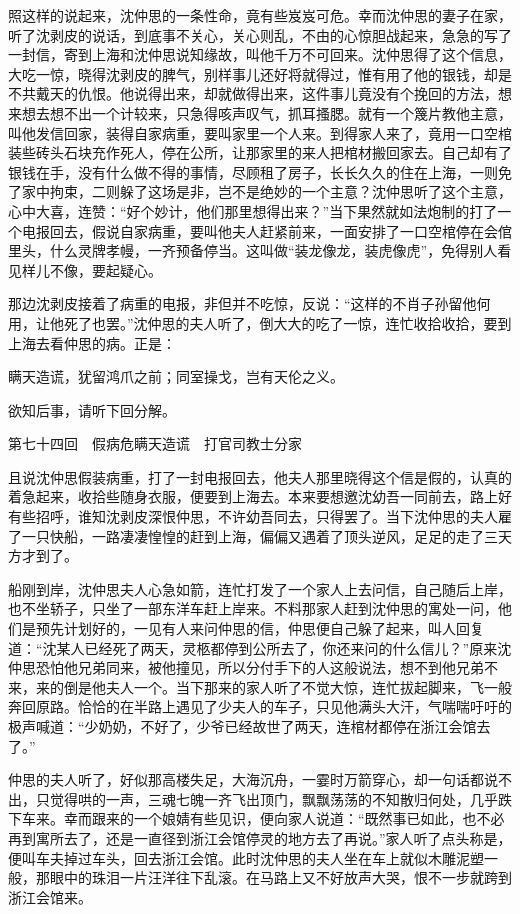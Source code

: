 \documentclass[12pt,UTF8]{ctexbook}
\begin{document}
{{{照这样的说起来，沈仲思的一条性命，竟有些岌岌可危。幸而沈仲思的妻子在家，听了沈剥皮的说话，到底事不关心，关心则乱，不由的心惊胆战起来，急急的写了一封信，寄到上海和沈仲思说知缘故，叫他千万不可回来。沈仲思得了这个信息，大吃一惊，晓得沈剥皮的脾气，别样事儿还好将就得过，惟有用了他的银钱，却是不共戴天的仇恨。他说得出来，却就做得出来，这件事儿竟没有个挽回的方法，想来想去想不出一个计较来，只急得咳声叹气，抓耳搔腮。就有一个篾片教他主意，叫他发信回家，装得自家病重，要叫家里一个人来。到得家人来了，竟用一口空棺装些砖头石块充作死人，停在公所，让那家里的来人把棺材搬回家去。自己却有了银钱在手，没有什么做不得的事情，尽顾租了房子，长长久久的住在上海，一则免了家中拘束，二则躲了这场是非，岂不是绝妙的一个主意？沈仲思听了这个主意，心中大喜，连赞：“好个妙计，他们那里想得出来？”当下果然就如法炮制的打了一个电报回去，假说自家病重，要叫他夫人赶紧前来，一面安排了一口空棺停在会倌里头，什么灵牌孝幔，一齐预备停当。这叫做“装龙像龙，装虎像虎”，免得别人看见样儿不像，要起疑心。

那边沈剥皮接着了病重的电报，非但并不吃惊，反说：“这样的不肖子孙留他何用，让他死了也罢。”沈仲思的夫人听了，倒大大的吃了一惊，连忙收拾收拾，要到上海去看仲思的病。正是：

瞒天造谎，犹留鸿爪之前；同室操戈，岂有天伦之义。

欲知后事，请听下回分解。





第七十四回　假病危瞒天造谎　打官司教士分家





且说沈仲思假装病重，打了一封电报回去，他夫人那里晓得这个信是假的，认真的着急起来，收拾些随身衣服，便要到上海去。本来要想邀沈幼吾一同前去，路上好有些招呼，谁知沈剥皮深恨仲思，不许幼吾同去，只得罢了。当下沈仲思的夫人雇了一只快船，一路凄凄惶惶的赶到上海，偏偏又遇着了顶头逆风，足足的走了三天方才到了。

船刚到岸，沈仲思夫人心急如箭，连忙打发了一个家人上去问信，自己随后上岸，也不坐轿子，只坐了一部东洋车赶上岸来。不料那家人赶到沈仲思的寓处一问，他们是预先计划好的，一见有人来问仲思的信，仲思便自己躲了起来，叫人回复道：“沈某人已经死了两天，灵柩都停到公所去了，你还来问的什么信儿？”原来沈仲思恐怕他兄弟同来，被他撞见，所以分付手下的人这般说法，想不到他兄弟不来，来的倒是他夫人一个。当下那来的家人听了不觉大惊，连忙拔起脚来，飞一般奔回原路。恰恰的在半路上遇见了少夫人的车子，只见他满头大汗，气喘喘吁吁的极声喊道：“少奶奶，不好了，少爷已经故世了两天，连棺材都停在浙江会馆去了。”

仲思的夫人听了，好似那高楼失足，大海沉舟，一霎时万箭穿心，却一句话都说不出，只觉得哄的一声，三魂七魄一齐飞出顶门，飘飘荡荡的不知散归何处，几乎跌下车来。幸而跟来的一个娘婧有些见识，便向家人说道：“既然事已如此，也不必再到寓所去了，还是一直径到浙江会馆停灵的地方去了再说。”家人听了点头称是，便叫车夫掉过车头，回去浙江会馆。此时沈仲思的夫人坐在车上就似木雕泥塑一般，那眼中的珠泪一片汪洋往下乱滚。在马路上又不好放声大哭，恨不一步就跨到浙江会馆来。

}}}
\end{document}
